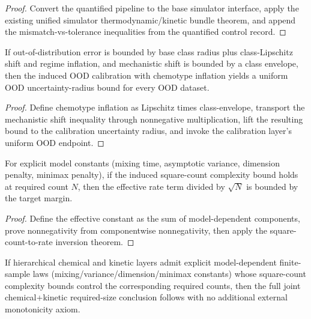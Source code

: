 \begin{proof}
Convert the quantified pipeline to the base simulator interface, apply the existing unified simulator thermodynamic/kinetic bundle theorem, and append the mismatch-vs-tolerance inequalities from the quantified control record.
\end{proof}

\begin{theorem}\label{thm:mechanistic-ood-uniform-transfer-bound}
If out-of-distribution error is bounded by base class radius plus class-Lipschitz shift and regime inflation, and mechanistic shift is bounded by a class envelope, then the induced OOD calibration with chemotype inflation yields a uniform OOD uncertainty-radius bound for every OOD dataset.
\end{theorem}

\begin{proof}
Define chemotype inflation as Lipschitz times class-envelope, transport the mechanistic shift inequality through nonnegative multiplication, lift the resulting bound to the calibration uncertainty radius, and invoke the calibration layer's uniform OOD endpoint.
\end{proof}

\begin{theorem}\label{thm:model-dependent-rate-term-target-margin}
For explicit model constants (mixing time, asymptotic variance, dimension penalty, minimax penalty), if the induced square-count complexity bound holds at required count $N$, then the effective rate term divided by $\sqrt{N}$ is bounded by the target margin.
\end{theorem}

\begin{proof}
Define the effective constant as the sum of model-dependent components, prove nonnegativity from componentwise nonnegativity, then apply the square-count-to-rate inversion theorem.
\end{proof}

\begin{theorem}\label{thm:hierarchical-required-size-model-dependent-constants}
If hierarchical chemical and kinetic layers admit explicit model-dependent finite-sample laws (mixing/variance/dimension/minimax constants) whose square-count complexity bounds control the corresponding required counts, then the full joint chemical+kinetic required-size conclusion follows with no additional external monotonicity axiom.
\end{theorem}

